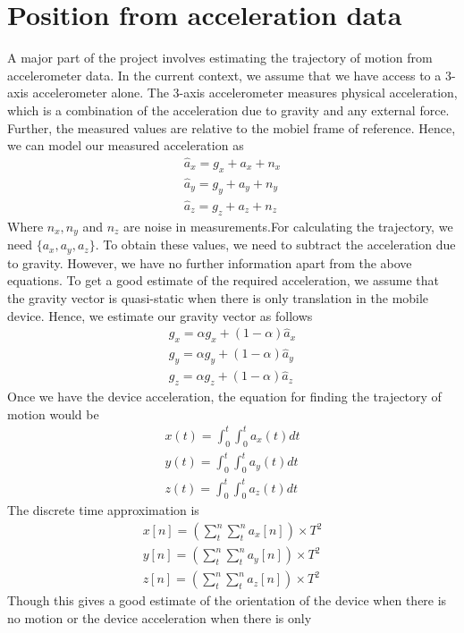 \documentclass[BTech]{iitmdiss}
\begin{document}
\section{Position from acceleration data}
\label{basic_theory:accel}
A major part of the project involves estimating the trajectory of motion
from accelerometer data. In the current context, we assume that we have
access to a 3-axis accelerometer alone. The 3-axis accelerometer 
measures physical acceleration, which is a combination of the 
acceleration due to gravity and any external force. Further, the 
measured values are relative to the mobiel frame of reference. Hence, 
we can model our measured acceleration as
\begin{align*}
\hat{a}_x= g_x + a_x + n_x\\
\hat{a}_y= g_y + a_y + n_y\\
\hat{a}_z= g_z + a_z + n_z
\end{align*}
Where $n_x, n_y$ and $n_z$ are noise in measurements.For calculating
 the trajectory, we need $\{a_x,a_y,a_z\}$. To obtain 
these values, we need to subtract the acceleration due to gravity. 
However, we have no further information apart from the above equations.
To get a good estimate of the required acceleration, we assume that the
gravity vector is quasi-static when there is only translation in the 
mobile device. Hence, we estimate our gravity vector as follows
\begin{align*}
g_x= \alpha{g_x} + (1-\alpha)\hat{a}_x\\
g_y= \alpha{g_y} + (1-\alpha)\hat{a}_y\\
g_z= \alpha{g_z} + (1-\alpha)\hat{a}_z
\end{align*}
Once we have the device acceleration, the equation for finding the 
trajectory of motion would be
\begin{align*}
x(t)=\int_0^{t}\int_0^{t}{a_x(t)dt}\\
y(t)=\int_0^{t}\int_0^{t}{a_y(t)dt}\\
z(t)=\int_0^{t}\int_0^{t}{a_z(t)dt}
\end{align*}
The discrete time approximation is
\begin{align*}
x[n]=({\sum}_{t}^{n}{\sum}_{t}^{n}a_x[n]){\times}T^2\\
y[n]=({\sum}_{t}^{n}{\sum}_{t}^{n}a_y[n]){\times}T^2\\
z[n]=({\sum}_{t}^{n}{\sum}_{t}^{n}a_z[n]){\times}T^2
\end{align*}
Though this gives a good estimate of the orientation of the device when
there is no motion or the device acceleration when there is only
\end{document}
